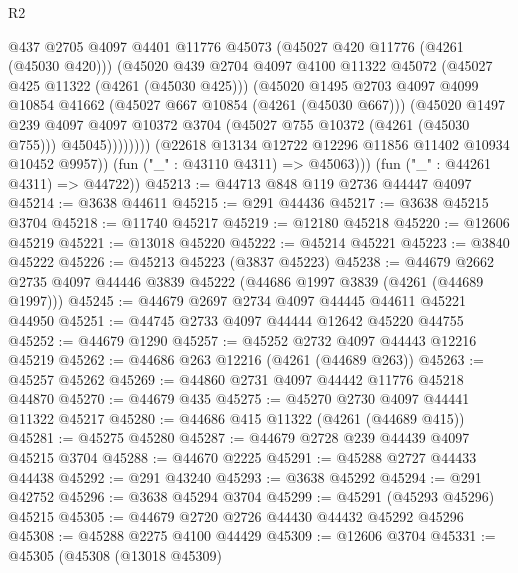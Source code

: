\begin{lexlean}{R2}
\begin{coremodule}
                      @437
                      @2705
                      @4097
                      @4401
                      @11776
                      @45073
                      (@45027 @420 @11776 (@4261 (@45030 @420)))
                      (@45020
                        @439
                        @2704
                        @4097
                        @4100
                        @11322
                        @45072
                        (@45027 @425 @11322 (@4261 (@45030 @425)))
                        (@45020
                          @1495
                          @2703
                          @4097
                          @4099
                          @10854
                          @41662
                          (@45027 @667 @10854 (@4261 (@45030 @667)))
                          (@45020
                            @1497
                            @239
                            @4097
                            @4097
                            @10372
                            @3704
                            (@45027 @755 @10372 (@4261 (@45030 @755)))
                            @45045))))))))
            (@22618 @13134 @12722 @12296 @11856 @11402 @10934 @10452 @9957))
          (fun ("_" : @43110 @4311) => @45063)))
      (fun ("_" : @44261 @4311) => @44722))
@45213 := @44713 @848 @119 @2736 @44447 @4097
@45214 := @3638 @44611
@45215 := @291 @44436
@45217 := @3638 @45215 @3704
@45218 := @11740 @45217
@45219 := @12180 @45218
@45220 := @12606 @45219
@45221 := @13018 @45220
@45222 := @45214 @45221
@45223 := @3840 @45222
@45226 := @45213 @45223 (@3837 @45223)
@45238 := @44679 @2662 @2735 @4097 @44446 @3839 @45222 (@44686 @1997 @3839 (@4261 (@44689 @1997)))
@45245 := @44679 @2697 @2734 @4097 @44445 @44611 @45221 @44950
@45251 := @44745 @2733 @4097 @44444 @12642 @45220 @44755
@45252 := @44679 @1290
@45257 := @45252 @2732 @4097 @44443 @12216 @45219
@45262 := @44686 @263 @12216 (@4261 (@44689 @263))
@45263 := @45257 @45262
@45269 := @44860 @2731 @4097 @44442 @11776 @45218 @44870
@45270 := @44679 @435
@45275 := @45270 @2730 @4097 @44441 @11322 @45217
@45280 := @44686 @415 @11322 (@4261 (@44689 @415))
@45281 := @45275 @45280
@45287 := @44679 @2728 @239 @44439 @4097 @45215 @3704
@45288 := @44670 @2225
@45291 := @45288 @2727 @44433 @44438
@45292 := @291 @43240
@45293 := @3638 @45292
@45294 := @291 @42752
@45296 := @3638 @45294 @3704
@45299 := @45291 (@45293 @45296) @45215
@45305 := @44679 @2720 @2726 @44430 @44432 @45292 @45296
@45308 := @45288 @2275 @4100 @44429
@45309 := @12606 @3704
@45331 := @45305
    (@45308
      (@13018 @45309)

\end{coremodule}
\end{lexlean}
